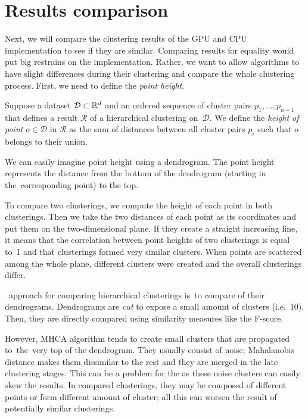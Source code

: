 \section{Results comparison}

Next, we will compare the clustering results of the GPU and CPU implementation to see if they are similar. Comparing results for equality would put big restrains on the implementation. Rather, we want to allow algorithms to have slight differences during their clustering and compare the whole clustering process. First, we need to define the \emph{point height}.

\begin{defn}
	Suppose a dataset $\mathcal{D} \subset \mathbb{R}^d$  and an ordered sequence of cluster pairs $p_1,\dots,p_{n-1}$ that defines a result $\mathcal{R}$ of a hierarchical clustering on~$\mathcal{D}$. We define the \emph{height of point} $o \in \mathcal{D}$ in $\mathcal{R}$ as the sum of distances between all cluster pairs $p_i$ such that $o$ belongs to  their union.
\end{defn}

We can easily imagine point height using a dendrogram. The point height represents the distance from the bottom of the dendrogram (starting in the~corresponding point) to the top.

To compare two clusterings, we compute the height of each point in both clusterings. Then we take the two distances of each point as its coordinates and put them on the two-dimensional plane. If they create a straight increasing line, it means that the correlation between point heights of two clusterings is equal to~1 and that clusterings formed very similar clusters. When points are scattered among the whole plane, different clusters were created and the overall clusterings differ.

\ approach for comparing hierarchical clusterings is\ to compare  of their dendrograms. Dendrograms are \emph{cut} to expose a small amount of clusters (i.e.~10). Then, they are directly compared using similarity measures like the F-score.

However,  MHCA algorithm tends to create small clusters that are propagated to~the~very top of the dendrogram. They usually consist of noise;  Mahalanobis distance makes them dissimilar to the rest and they are merged in the late clustering stages. This can be a problem for the  as these noise clusters can easily skew the results. In compared clusterings, they may be composed of different points or form different amount of cluster; all this can worsen the result of potentially similar clusterings. 

